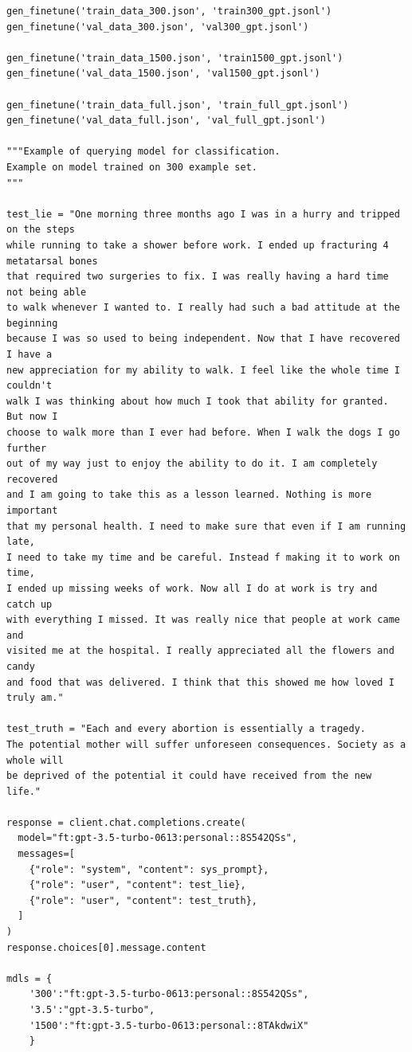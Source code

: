 \documentclass[10pt,twocolumn,letterpaper]{article}
\begin{document}
\begin{verbatim}
gen_finetune('train_data_300.json', 'train300_gpt.jsonl')
gen_finetune('val_data_300.json', 'val300_gpt.jsonl')

gen_finetune('train_data_1500.json', 'train1500_gpt.jsonl')
gen_finetune('val_data_1500.json', 'val1500_gpt.jsonl')

gen_finetune('train_data_full.json', 'train_full_gpt.jsonl')
gen_finetune('val_data_full.json', 'val_full_gpt.jsonl')

"""Example of querying model for classification.  
Example on model trained on 300 example set.
"""

test_lie = "One morning three months ago I was in a hurry and tripped on the steps 
while running to take a shower before work. I ended up fracturing 4 metatarsal bones 
that required two surgeries to fix. I was really having a hard time not being able 
to walk whenever I wanted to. I really had such a bad attitude at the beginning 
because I was so used to being independent. Now that I have recovered I have a 
new appreciation for my ability to walk. I feel like the whole time I couldn't 
walk I was thinking about how much I took that ability for granted. But now I 
choose to walk more than I ever had before. When I walk the dogs I go further 
out of my way just to enjoy the ability to do it. I am completely recovered 
and I am going to take this as a lesson learned. Nothing is more important 
that my personal health. I need to make sure that even if I am running late, 
I need to take my time and be careful. Instead f making it to work on time, 
I ended up missing weeks of work. Now all I do at work is try and catch up 
with everything I missed. It was really nice that people at work came and 
visited me at the hospital. I really appreciated all the flowers and candy 
and food that was delivered. I think that this showed me how loved I truly am."

test_truth = "Each and every abortion is essentially a tragedy. 
The potential mother will suffer unforeseen consequences. Society as a whole will 
be deprived of the potential it could have received from the new life."

response = client.chat.completions.create(
  model="ft:gpt-3.5-turbo-0613:personal::8S542QSs",
  messages=[
    {"role": "system", "content": sys_prompt},
    {"role": "user", "content": test_lie},
    {"role": "user", "content": test_truth},
  ]
)
response.choices[0].message.content

mdls = {
    '300':"ft:gpt-3.5-turbo-0613:personal::8S542QSs",
    '3.5':"gpt-3.5-turbo",
    '1500':"ft:gpt-3.5-turbo-0613:personal::8TAkdwiX"
    }


\end{verbatim}
\end{document}
